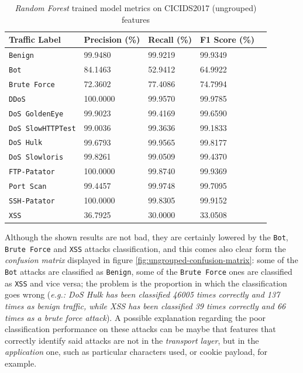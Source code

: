 \begin{table}[h!]
   \centering
   \begin{tabular}{l|llll}
       \toprule 
       Traffic Label & Precision (\%) & Recall (\%) & F1 Score (\%) \\
       \midrule
       \rowcolor{black!10} \texttt{Benign} & 99.9480 & 99.9219 & 99.9349 \\
       \texttt{Bot} & 84.1463 & 52.9412 & 64.9922 \\
       \rowcolor{black!10} \texttt{Brute Force} & 72.3602 & 77.4086 & 74.7994 \\
       \texttt{DDoS} & 100.0000 & 99.9570 & 99.9785 \\
       \rowcolor{black!10} \texttt{DoS GoldenEye} & 99.9023 & 99.4169 & 99.6590 \\
       \texttt{DoS SlowHTTPTest} & 99.0036 & 99.3636 & 99.1833 \\
       \rowcolor{black!10} \texttt{DoS Hulk} & 99.6793 & 99.9565 & 99.8177 \\
       \texttt{DoS Slowloris} & 99.8261 & 99.0509 & 99.4370 \\
       \rowcolor{black!10} \texttt{FTP-Patator} & 100.0000 & 99.8740 & 99.9369 \\
       \texttt{Port Scan} & 99.4457 & 99.9748 & 99.7095 \\
       \rowcolor{black!10} \texttt{SSH-Patator} & 100.0000 & 99.8305 & 99.9152 \\
       \texttt{XSS} & 36.7925 & 30.0000 & 33.0508 \\
       \bottomrule
   \end{tabular}
   \caption{\textit{Random Forest} trained model metrics on CICIDS2017 (ungrouped) features}
   \label{tab:ungrouped-metrics}
\end{table}

Although the shown results are not bad, they are certainly lowered by the \texttt{Bot}, \texttt{Brute Force} and \texttt{XSS} attacks classification, and this comes also clear form the \textit{confusion matrix} displayed in figure \ref{fig:ungrouped-confusion-matrix}: some of the \texttt{Bot} attacks are classified as \texttt{Benign}, some of the \texttt{Brute Force} ones are classified as \texttt{XSS} and vice versa; the problem is the proportion in which the classification goes wrong (\textit{e.g.: DoS Hulk has been classified 46005 times correctly and 137 times as benign traffic, while XSS has been classified 39 times correctly and 66 times as a brute force attack}). A possible explanation regarding the poor classification performance on these attacks can be maybe that features that correctly identify said attacks are not in the \textit{transport layer}, but in the \textit{application} one, such as particular characters used, or cookie payload, for example.


